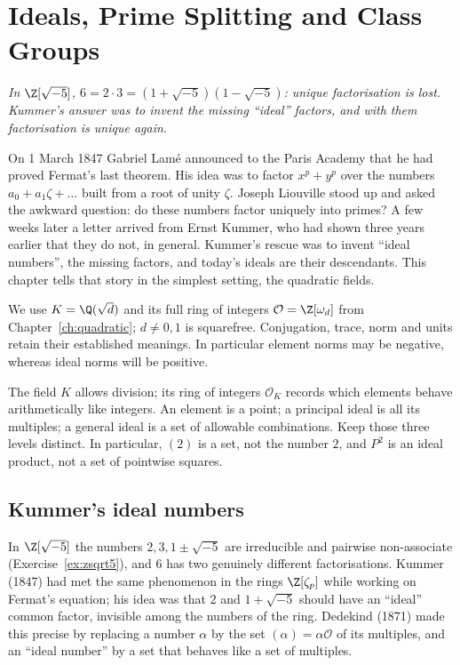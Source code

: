 \chapter{Ideals, Prime Splitting and Class Groups}\label{ch:ideals}

\begin{center}\itshape
In $\Z[\sqrt{-5}]$, $6=2\cdot3=(1+\sqrt{-5})(1-\sqrt{-5})$: unique factorisation is lost.\\
Kummer's answer was to invent the missing ``ideal'' factors, and with them factorisation is unique again.
\end{center}

On 1 March 1847 Gabriel Lam\'e announced to the Paris Academy that he had proved Fermat's last theorem. His idea was to factor $x^p+y^p$ over the
numbers $a_0+a_1\zeta+\dots$ built from a root of unity $\zeta$. Joseph Liouville stood up and asked the awkward question: do these numbers factor uniquely
into primes? A few weeks later a letter arrived from Ernst Kummer, who had shown three years earlier that they do not, in general. Kummer's rescue was to
invent ``ideal numbers'', the missing factors, and today's ideals are their descendants. This chapter tells that story in the simplest setting, the
quadratic fields.

We use $K=\Q(\sqrt d)$ and its full ring of integers
$\mathcal O=\Z[\omega_d]$ from Chapter~\ref{ch:quadratic};
$d\ne0,1$ is squarefree. Conjugation, trace, norm and units
retain their established meanings. In particular element norms may be
negative, whereas ideal norms will be positive.

\begin{reminder}
The field $K$ allows division; its ring of integers $\mathcal O_K$ records which
elements behave arithmetically like integers. An element is a point; a principal
ideal is all its multiples; a general ideal is a set of allowable combinations.
Keep those three levels distinct. In particular, $(2)$ is a set, not the number
$2$, and $P^2$ is an ideal product, not a set of pointwise squares.
\end{reminder}

\section{Kummer's ideal numbers}

In $\Z[\sqrt{-5}]$ the numbers $2,3,1\pm\sqrt{-5}$ are irreducible and pairwise non-associate (Exercise~\ref{ex:zsqrt5}), and $6$ has two genuinely different factorisations. Kummer (1847) had met the same phenomenon in the rings $\Z[\zeta_p]$ while working on Fermat's equation; his idea was that $2$ and $1+\sqrt{-5}$ should have an ``ideal'' common factor, invisible among the numbers of the ring. Dedekind (1871) made this precise by replacing a number $\alpha$ by the set $(\alpha)=\alpha\mathcal O$ of its multiples, and an ``ideal number'' by a set that behaves like a set of multiples.

